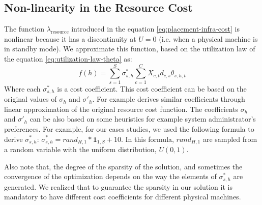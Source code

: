 \subsection{Non-linearity in the Resource Cost}
The function $\lambda_\text{resource}$ introduced in the equation \ref{eq:placement-infra-cost} is nonlinear because it has a discontinuity at $U=0$ (i.e. when a physical machine is in standby mode). 
We approximate this function, based on the utilization law of the equation \ref{eq:utilization-law-theta} as:
 \[
	 f(h)=\sum^S_{s=1}  \sigma^*_{s,h} \sum_{c=1}^C X_{c,t} d_{c,s} \theta_{s,h,t}
\]
Where each  $\sigma^*_{s,h}$ is a cost coefficient. 
This cost coefficient can be based on the original values of $\sigma_{h}$ and $\sigma'_{h}$. 
For example \cite{li_fast_2009} derives similar coefficients through linear approximation of the original resource cost function.
The coefficients $\sigma_{h}$ and $\sigma'_{h}$ can be also based on some heuristics for example system administrator's preferences.
For example, for our cases studies, we used the following formula to derive $\sigma^*_{s,h}$: $\sigma^*_{s,h}=rand_{H,1}*\textbf{1}_{1,S}+10$.
In this formula, $rand_{H,1}$ are sampled from a random variable with the uniform distribution, $U(0,1)$.

  Also note that, the degree of the sparsity of the solution, and sometimes the convergence of the optimization depends on the way the elements of $\sigma^*_{s,h}$ are generated. We realized that to guarantee the sparsity in our solution it is mandatory to have different cost coefficients for different physical machines. 
 
% 


